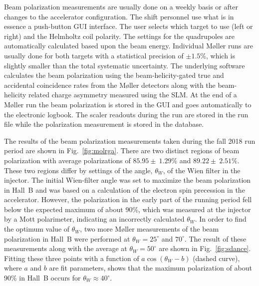 Beam polarization measurements are usually done on a weekly basis or after changes to the accelerator configuration.
The shift personnel use what is in essence a push-button GUI interface. The user selects which target to use (left
or right) and the Helmholtz coil polarity. The settings for the quadrupoles are automatically calculated based upon
the beam energy. Individual M{\o}ller runs are usually done for both targets with a statistical precision of
$\pm 1.5$\%, which is slightly smaller than the total systematic uncertainty. The underlying software calculates the
beam polarization using the beam-helicity-gated true and accidental coincidence rates from the M{\o}ller detectors
along with the beam-helicity related charge asymmetry measured using the SLM. At the end of a M{\o}ller run the
beam polarization is stored in the GUI and goes automatically to the electronic logbook. The scaler readouts during
the run are stored in the run file while the polarization measurement is stored in the database. 

The results of the beam polarization measurements taken during the fall 2018 run period are shown in
Fig.~\ref{fig:molrga}. There are two distinct regions of beam polarization with average polarizations of
$85.95\pm ~1.29\%$ and $89.22\pm~2.51\%$. These two regions differ by settings of the angle, $\theta_W$,
of the Wien filter in the injector. The initial Wien-filter angle was set to maximize the beam polarization in
Hall~B and was based on a calculation of the electron spin precession in the accelerator. However, the polarization
in the early part of the running period fell below the expected maximum of about 90\%, which was measured at the
injector by a Mott polarimeter, indicating an incorrectly calculated $\theta_W$. In order to find the optimum value
of $\theta_W$,  two more M{\o}ller measurements of the beam polarization in Hall~B were performed at
$\theta_W=25^\circ$ and $70^\circ$. The result of these measurements along with the average at
$\theta_W=50^\circ$ are shown in Fig.~\ref{fig:sdance}. Fitting these three points with a function of
$a\cos\left(\theta_W-b\right)$ (dashed curve), where $a$ and $b$ are fit parameters, shows that the maximum
polarization of about 90\% in Hall~B occurs for $\theta_W\approx 40^\circ$.
 
